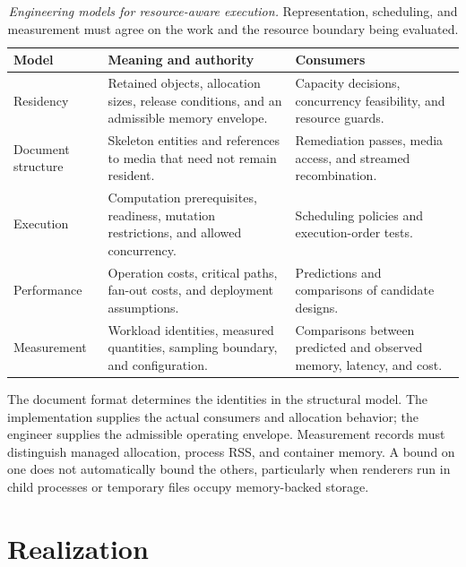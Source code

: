{\footnotesize
\begin{longtable}{@{}p{.20\linewidth}p{.36\linewidth}p{.36\linewidth}@{}}
\caption[Engineering models for resource-aware execution]{\emph{Engineering models for resource-aware execution.} Representation, scheduling, and measurement must agree on the work and the resource boundary being evaluated.}\label{handbook-resource-models}\\
\toprule
\textbf{Model} & \textbf{Meaning and authority} & \textbf{Consumers} \\
\midrule\endhead
Residency & Retained objects, allocation sizes, release conditions, and an admissible memory envelope. & Capacity decisions, concurrency feasibility, and resource guards. \\
Document structure & Skeleton entities and references to media that need not remain resident. & Remediation passes, media access, and streamed recombination. \\
Execution & Computation prerequisites, readiness, mutation restrictions, and allowed concurrency. & Scheduling policies and execution-order tests. \\
Performance & Operation costs, critical paths, fan-out costs, and deployment assumptions. & Predictions and comparisons of candidate designs. \\
Measurement & Workload identities, measured quantities, sampling boundary, and configuration. & Comparisons between predicted and observed memory, latency, and cost. \\
\bottomrule
\end{longtable}
}

The document format determines the identities in the structural model. The implementation supplies the actual consumers and allocation behavior; the engineer supplies the admissible operating envelope. Measurement records must distinguish managed allocation, process RSS, and container memory. A bound on one does not automatically bound the others, particularly when renderers run in child processes or temporary files occupy memory-backed storage.

\section{Realization}

